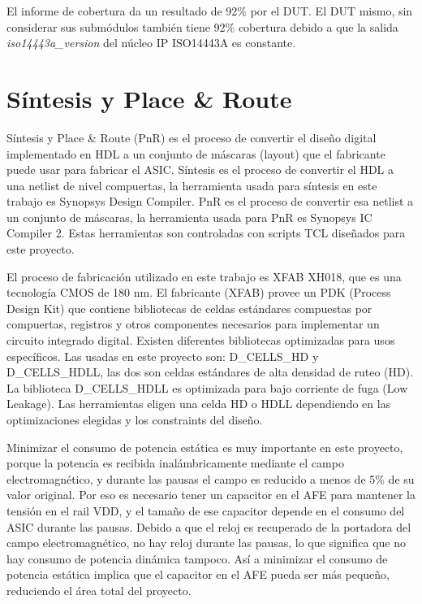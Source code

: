 \documentclass[a4paper, twoside, 11pt]{report}
\begin{document}
El informe de cobertura da un resultado de 92\% por el DUT. El DUT mismo, sin considerar sus submódulos también tiene 92\% cobertura debido a que la salida \textit{iso14443a\_version} del núcleo IP ISO14443A es constante.


\FloatBarrier
\chapter{Síntesis y Place \& Route}

Síntesis y Place \& Route (PnR) es el proceso de convertir el diseño digital implementado en HDL a un conjunto de máscaras (layout) que el fabricante puede usar para fabricar el ASIC. Síntesis es el proceso de convertir el HDL a una netlist de nivel compuertas, la herramienta usada para síntesis en este trabajo es Synopsys Design Compiler. PnR es el proceso de convertir esa netlist a un conjunto de máscaras, la herramienta usada para PnR es Synopsys IC Compiler 2. Estas herramientas son controladas con scripts TCL diseñados para este proyecto.

El proceso de fabricación utilizado en este trabajo es XFAB XH018, que es una tecnología CMOS de 180 nm. El fabricante (XFAB) provee un PDK (Process Design Kit) que contiene bibliotecas de celdas estándares compuestas por compuertas, registros y otros componentes necesarios para implementar un circuito integrado digital. Existen diferentes bibliotecas optimizadas para usos específicos. Las usadas en este proyecto son: D\_CELLS\_HD y D\_CELLS\_HDLL, las dos son celdas estándares de alta densidad de ruteo (HD). La biblioteca D\_CELLS\_HDLL es optimizada para bajo corriente de fuga (Low Leakage). Las herramientas eligen una celda HD o HDLL dependiendo en las optimizaciones elegidas y los constraints del diseño.

Minimizar el consumo de potencia estática es muy importante en este proyecto, porque la potencia es recibida inalámbricamente mediante el campo electromagnético, y durante las pausas el campo es reducido a menos de 5\% de su valor original. Por eso es necesario tener un capacitor en el AFE para mantener la tensión en el rail VDD, y el tamaño de ese capacitor depende en el consumo del ASIC durante las pausas. Debido a que el reloj es recuperado de la portadora del campo electromagnético, no hay reloj durante las pausas, lo que significa que no hay consumo de potencia dinámica tampoco. Así a minimizar el consumo de potencia estática implica que el capacitor en el AFE pueda ser más pequeño, reduciendo el área total del proyecto.
\end{document}
